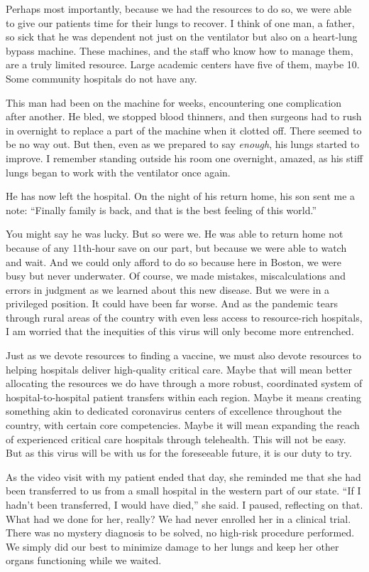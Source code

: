 Perhaps most importantly, because we had the resources to do so, we were
able to give our patients time for their lungs to recover. I think of
one man, a father, so sick that he was dependent not just on the
ventilator but also on a heart-lung bypass machine. These machines, and
the staff who know how to manage them, are a truly limited resource.
Large academic centers have five of them, maybe 10. Some community
hospitals do not have any.

This man had been on the machine for weeks, encountering one
complication after another. He bled, we stopped blood thinners, and then
surgeons had to rush in overnight to replace a part of the machine when
it clotted off. There seemed to be no way out. But then, even as we
prepared to say \emph{enough}, his lungs started to improve. I remember
standing outside his room one overnight, amazed, as his stiff lungs
began to work with the ventilator once again.

He has now left the hospital. On the night of his return home, his son
sent me a note: ``Finally family is back, and that is the best feeling
of this world.''

You might say he was lucky. But so were we. He was able to return home
not because of any 11th-hour save on our part, but because we were able
to watch and wait. And we could only afford to do so because here in
Boston, we were busy but never underwater. Of course, we made mistakes,
miscalculations and errors in judgment as we learned about this new
disease. But we were in a privileged position. It could have been far
worse. And as the pandemic tears through rural areas of the country with
even less access to resource-rich hospitals, I am worried that the
inequities of this virus will only become more entrenched.

Just as we devote resources to finding a vaccine, we must also devote
resources to helping hospitals deliver high-quality critical care. Maybe
that will mean better allocating the resources we do have through a more
robust, coordinated system of hospital-to-hospital patient transfers
within each region. Maybe it means creating something akin to dedicated
coronavirus centers of excellence throughout the country, with certain
core competencies. Maybe it will mean expanding the reach of experienced
critical care hospitals through telehealth. This will not be easy. But
as this virus will be with us for the foreseeable future, it is our duty
to try.

As the video visit with my patient ended that day, she reminded me that
she had been transferred to us from a small hospital in the western part
of our state. ``If I hadn't been transferred, I would have died,'' she
said. I paused, reflecting on that. What had we done for her, really? We
had never enrolled her in a clinical trial. There was no mystery
diagnosis to be solved, no high-risk procedure performed. We simply did
our best to minimize damage to her lungs and keep her other organs
functioning while we waited.

